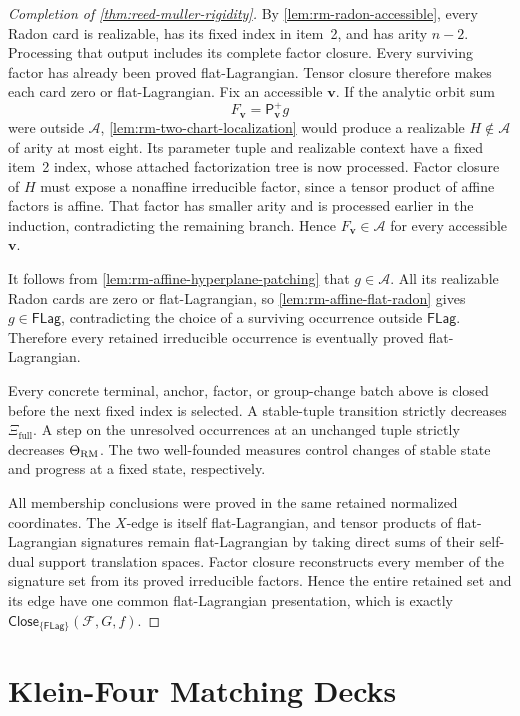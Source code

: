 \documentclass[11pt,letterpaper,onecolumn]{article}
\theoremstyle{plain}
\theoremstyle{definition}
\theoremstyle{remark}
\newcommand{\cF}{\mathcal F}
\newcommand{\cA}{\mathscr A}
\newcommand{\Close}{\mathsf{Close}}
\newcommand{\FLag}{\mathsf{FLag}}
\begin{document}
\begin{proof}[Completion of \cref{thm:reed-muller-rigidity}]
By \cref{lem:rm-radon-accessible}, every
Radon card is realizable, has its fixed index in item~2, and has arity
\(n-2\).  Processing that output includes its complete factor closure.
Every surviving factor has already been proved flat-Lagrangian. Tensor closure therefore makes each card zero or
flat-Lagrangian.  Fix an accessible \({\mathbf{v}}\).  If the analytic orbit sum
 \[
 F_{\mathbf{v}}=\mathsf P_{\mathbf{v}}^+g
 \]
were outside \(\cA\), \cref{lem:rm-two-chart-localization} would
produce a realizable \(H\notin\cA\) of arity at most eight.  Its parameter
tuple and realizable context have a fixed item~2 index, whose attached factorization tree is now processed.  Factor closure of \(H\) must expose a
nonaffine irreducible factor, since a tensor product
of affine factors is affine.  That factor has smaller arity and is processed
earlier in the induction, contradicting the remaining branch.  Hence
\(F_{\mathbf{v}}\in\cA\) for every accessible \({\mathbf{v}}\).

It follows from \cref{lem:rm-affine-hyperplane-patching} that
\(g\in\cA\).  All its realizable Radon cards are zero or flat-Lagrangian, so
\cref{lem:rm-affine-flat-radon} gives \(g\in\FLag\), contradicting the
choice of a surviving occurrence outside \(\FLag\).  Therefore every retained
irreducible occurrence is eventually proved flat-Lagrangian.

Every concrete terminal, anchor, factor, or group-change batch above is
closed before the next fixed index is selected.  A stable-tuple transition
strictly decreases \(\Xi_{\mathrm{full}}\). A step on the unresolved occurrences at an unchanged tuple strictly
decreases \(\Theta_{\rm RM}\).  The two well-founded measures control changes of stable state and progress
at a fixed state, respectively.

All membership conclusions were proved in the same retained normalized coordinates.
The \(X\)-edge is itself flat-Lagrangian, and tensor products of
flat-Lagrangian signatures remain flat-Lagrangian by taking direct sums of
their self-dual support translation spaces.  Factor closure reconstructs
every member of the signature set from its proved irreducible factors.  Hence
the entire retained set and its edge have one common flat-Lagrangian
presentation, which is exactly
\(\Close_{\{\FLag\}}(\cF,G,f)\).
\end{proof}

\section{Klein-Four Matching Decks}
\label{sec:v4-deck}
\end{document}
